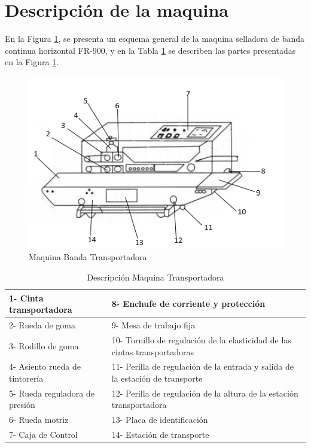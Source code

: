 \newpage
\section{Descripción de la maquina}
En la Figura \ref{fig:Banda}, se presenta un esquema general de la maquina selladora de banda continua horizontal FR-900, y en la Tabla \ref{table:Banda} se describen las partes presentadas en la Figura \ref{fig:Banda}.
\begin{figure}[ht]
	\centering
	\includegraphics[scale=0.95]{Figs/65.png}
	\caption{Maquina Banda Transportadora}
	\label{fig:Banda}
\end{figure}

\begin{table}[ht]
	\centering
	\begin{tabular}{|p{5cm}|p{8cm}|}
		\hline
		1- Cinta transportadora & 8- Enchufe de corriente y protección \\ 
		\hline
		2- Rueda de goma& 9- Mesa de trabajo fija\\
		\hline
		3- Rodillo de goma& 10- Tornillo de regulación de la elasticidad de las cintas transportadoras\\
		\hline
		4- Asiento rueda de tintorería& 11- Perilla de regulación de la entrada y salida de la estación de transporte\\
		\hline
		5- Rueda reguladora de presión& 12- Perilla de regulación de la altura de la estación transportadora\\
		\hline
		6- Rueda motriz& 13- Placa de identificación\\
		\hline
		7- Caja de Control& 14- Estación de transporte\\
		\hline
	\end{tabular}	
	\caption{Descripción Maquina Transportadora}
	\label{table:Banda}
\end{table}

